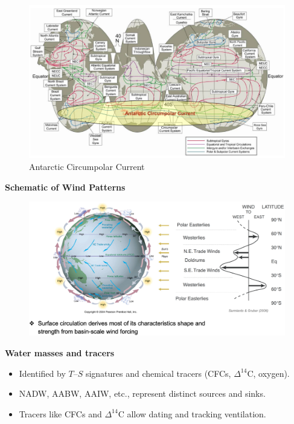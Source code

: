 \documentclass[fontsize=8pt, a4paper, landscape, fleqn]{scrartcl}
\renewcommand{\subsection}[1]{%
    \noindent\colorbox{subsectioncolor}{%
        \parbox{\dimexpr\columnwidth-2\fboxsep}{\color{white}\textbf{#1}}}%
    \vspace{0.5mm}%
}
\begin{document}
\begin{multicols*}{3}[\raggedcolumns]
\begin{figure}[H]
    \centering
    \includegraphics[width=0.9\linewidth]{CS//img/circumpolar_current.png}
    \caption{Antarctic Circumpolar Current}
\end{figure}

\subsection{Schematic of Wind Patterns}

\begin{figure}[H]
    \centering
    \includegraphics[width=0.7\linewidth]{CS//img/Schematic_Wind.png}
\end{figure}

\subsection{Water masses and tracers}
\begin{itemize}
    \item Identified by $T$–$S$ signatures and chemical tracers (CFCs, $\Delta^{14}$C, oxygen).
    \item NADW, AABW, AAIW, etc., represent distinct sources and sinks.
    \item Tracers like CFCs and $\Delta^{14}$C allow dating and tracking ventilation.
\end{itemize}


\end{multicols*}
\end{document}
